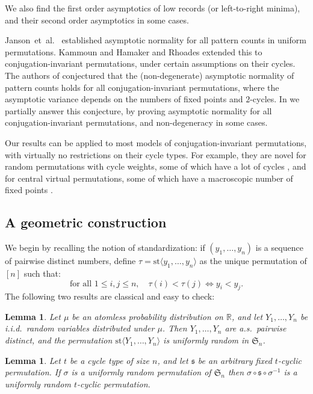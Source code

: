 \documentclass{article}
\newtheorem{lem}[theorem]{Lemma}
\theoremstyle{remark}
\def\R{\mathbb{R}}
\def\S{\mathfrak{S}}
\def\fs{\mathfrak{s}}
\newcommand{\st}[1]{\mathrm{st}\langle#1\rangle}
\begin{document}
\begin{description}
    We also find the first order asymptotics of low records (or left-to-right minima), and their second order asymptotics in some cases.
    \item[Pattern counts.] Janson~et~al.~\cite{JNZ15} established asymptotic normality for all pattern counts in uniform permutations.
    Kammoun \cite{K22} and Hamaker and Rhoades \cite{HR22} extended this to conjugation-invariant permutations, under certain assumptions on their cycles.
    The authors of \cite{HR22} conjectured that the (non-degenerate) asymptotic normality of pattern counts holds for all conjugation-invariant permutations, where the asymptotic variance depends on the numbers of fixed points and $2$-cycles.
    In  we partially answer this conjecture, by proving asymptotic normality for all conjugation-invariant permutations, and non-degeneracy in some cases.
\end{description}

Our results can be applied to most models of conjugation-invariant permutations, with virtually no restrictions on their cycle types.
For example, they are novel for random permutations with cycle weights, some of which have a lot of cycles \cite{BUV11,EU14}, and for central virtual permutations, some of which have a macroscopic number of fixed points \cite{T00}.


\subsection{A geometric construction}
\label{sec: geometric construction}

We begin by recalling the notion of standardization:
if $(y_1, \dots, y_n)$ is a sequence of pairwise distinct numbers, define $\tau = \st{y_1,\dots,y_n}$ as the unique permutation of $[n]$ such that:
\[
    \text{for all }1\le i,j\le n,\quad \tau(i)<\tau(j) \Leftrightarrow y_i<y_j .
\]
The following two results are classical and easy to check:

\begin{lem}\label{lem: standardization}
    Let $\mu$ be an atomless probability distribution on $\R$, and let $Y_1, \dots, Y_n$ be i.i.d.~random variables distributed under $\mu$.
    Then $Y_1, \dots, Y_n$ are a.s.~pairwise distinct, and the permutation $\st{Y_1,\dots,Y_n}$ is uniformly random in $\S_n$.
\end{lem}

\begin{lem}\label{lem: randomly conjugating}
    Let $t$ be a cycle type of size $n$, and let $\fs$ be an arbitrary fixed $t$-cyclic permutation.
    If $\sigma$ is a uniformly random permutation of $\S_n$ then $\sigma\circ \fs\circ \sigma^{-1}$ is a uniformly random $t$-cyclic permutation.
\end{lem}
\end{document}
